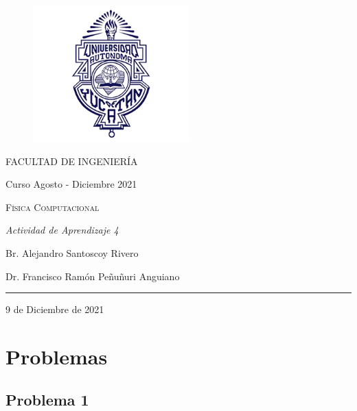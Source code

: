 \documentclass[a4paper, 12pt]{article}
\begin{document}
    \begin{center}
        \begin{Large}

            \begin{figure}[H]	
                \centering
                \includegraphics[width = 6cm]{./img/logo_UADY.png}
                \label{uady}
            \end{figure}
            \textsc{FACULTAD DE INGENIERÍA}
                
            \medskip

            Curso Agosto - Diciembre 2021

            \medskip

            \textsc{Física Computacional}

            \medskip

            \textsl{Actividad de Aprendizaje 4}

            \medskip

            Br. Alejandro Santoscoy Rivero

            \medskip

            Dr. Francisco Ramón Peñuñuri Anguiano

            \rule{0.3\paperwidth}{0.5pt}

            \medskip

            9 de Diciembre de 2021

        \end{Large}
    \end{center}
    \newpage

    \section{Problemas}

    \subsection{Problema 1}
\end{document}
